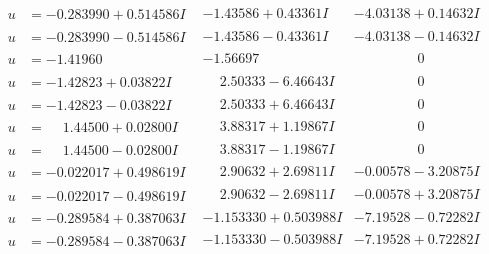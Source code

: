\documentclass[1p]{elsarticle_modified}
\theoremstyle{definition}
\begin{document}
$$\begin{array}{c|c|c}
\begin{aligned}
u &= -0.283990 + 0.514586 I\end{aligned}
 & -1.43586 + 0.43361 I & -4.03138 + 0.14632 I \\ \hline\begin{aligned}
u &= -0.283990 - 0.514586 I\end{aligned}
 & -1.43586 - 0.43361 I & -4.03138 - 0.14632 I \\ \hline\begin{aligned}
u &= -1.41960\phantom{ +0.000000I}\end{aligned}
 & -1.56697\phantom{ +0.000000I} & \phantom{-0.000000 } 0 \\ \hline\begin{aligned}
u &= -1.42823 + 0.03822 I\end{aligned}
 & \phantom{-}2.50333 - 6.46643 I & \phantom{-0.000000 } 0 \\ \hline\begin{aligned}
u &= -1.42823 - 0.03822 I\end{aligned}
 & \phantom{-}2.50333 + 6.46643 I & \phantom{-0.000000 } 0 \\ \hline\begin{aligned}
u &= \phantom{-}1.44500 + 0.02800 I\end{aligned}
 & \phantom{-}3.88317 + 1.19867 I & \phantom{-0.000000 } 0 \\ \hline\begin{aligned}
u &= \phantom{-}1.44500 - 0.02800 I\end{aligned}
 & \phantom{-}3.88317 - 1.19867 I & \phantom{-0.000000 } 0 \\ \hline\begin{aligned}
u &= -0.022017 + 0.498619 I\end{aligned}
 & \phantom{-}2.90632 + 2.69811 I & -0.00578 - 3.20875 I \\ \hline\begin{aligned}
u &= -0.022017 - 0.498619 I\end{aligned}
 & \phantom{-}2.90632 - 2.69811 I & -0.00578 + 3.20875 I \\ \hline\begin{aligned}
u &= -0.289584 + 0.387063 I\end{aligned}
 & -1.153330 + 0.503988 I & -7.19528 - 0.72282 I \\ \hline\begin{aligned}
u &= -0.289584 - 0.387063 I\end{aligned}
 & -1.153330 - 0.503988 I & -7.19528 + 0.72282 I \\ \hline\begin{aligned}

\end{aligned}
\end{array}$$
\end{document}
